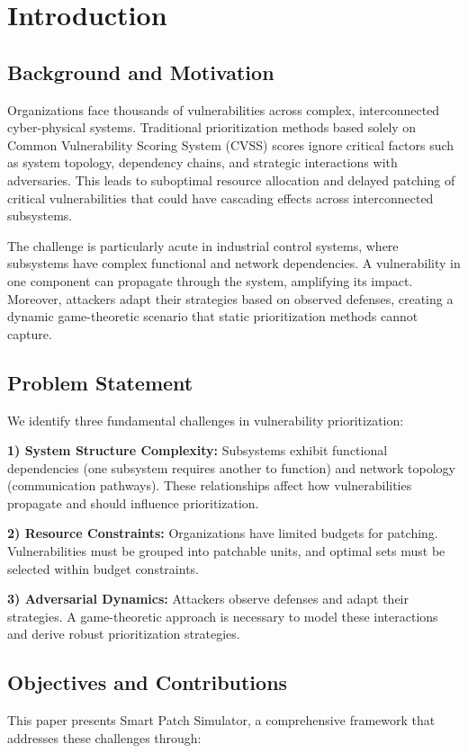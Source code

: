 \documentclass[conference]{IEEEtran}
\begin{document}
\section{Introduction}

\subsection{Background and Motivation}
Organizations face thousands of vulnerabilities across complex, interconnected cyber-physical systems. Traditional prioritization methods based solely on Common Vulnerability Scoring System (CVSS) scores ignore critical factors such as system topology, dependency chains, and strategic interactions with adversaries. This leads to suboptimal resource allocation and delayed patching of critical vulnerabilities that could have cascading effects across interconnected subsystems.

The challenge is particularly acute in industrial control systems, where subsystems have complex functional and network dependencies. A vulnerability in one component can propagate through the system, amplifying its impact. Moreover, attackers adapt their strategies based on observed defenses, creating a dynamic game-theoretic scenario that static prioritization methods cannot capture.

\subsection{Problem Statement}
We identify three fundamental challenges in vulnerability prioritization:

\textbf{1) System Structure Complexity:} Subsystems exhibit functional dependencies (one subsystem requires another to function) and network topology (communication pathways). These relationships affect how vulnerabilities propagate and should influence prioritization.

\textbf{2) Resource Constraints:} Organizations have limited budgets for patching. Vulnerabilities must be grouped into patchable units, and optimal sets must be selected within budget constraints.

\textbf{3) Adversarial Dynamics:} Attackers observe defenses and adapt their strategies. A game-theoretic approach is necessary to model these interactions and derive robust prioritization strategies.

\subsection{Objectives and Contributions}
This paper presents Smart Patch Simulator, a comprehensive framework that addresses these challenges through:
\end{document}
